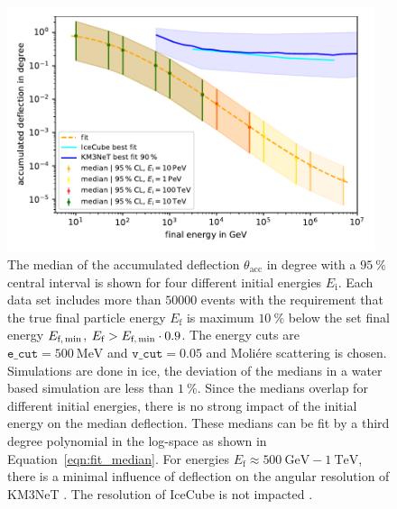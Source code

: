 \begin{figure}
    \centering 
    \includegraphics[width=0.96\textwidth]{figures/fit_median_defl_cut_10percent_only_poly.pdf}
    \caption{The median of the accumulated deflection $\theta_{\text{acc}}$ in degree 
    with a $\SI{95}{\percent}$ 
    central interval is shown for four different initial energies $E_{\text{i}}$. 
    Each data set includes more than $\num{50000}$ events with the requirement 
    that the true final particle energy $E_{\text{f}}$ is maximum 
    $\SI{10}{\percent}$ below the set final energy $E_{\text{f,\,min}}$,   
    $E_{\text{f}} > E_{\text{f,\,min}} \cdot 0.9$. The energy cuts are $\texttt{e\_cut} = \SI{500}{\mega\electronvolt}$ and $\texttt{v\_cut} = 0.05$ and 
    Moliére scattering is chosen. Simulations are done in ice, the deviation 
    of the medians in a water based simulation are less than $\SI{1}{\percent}$.
    Since the medians overlap for different initial energies, there is no 
    strong impact of the initial energy on the median deflection. These 
    medians can be fit by a third degree polynomial in the log-space as 
    shown in Equation~\ref{eqn:fit_median}. For energies 
    $E_{\text{f}} \approx \SI{500}{\giga\electronvolt} - \SI{1}{\tera\electronvolt}$, there is a minimal influence of deflection on the angular resolution of 
    KM3NeT \cite{KM3NeT_Resolution2016}. The resolution of IceCube is not 
    impacted \cite{IceCube_Resolution2021}.}
    \label{fig:fit_median}
\end{figure}